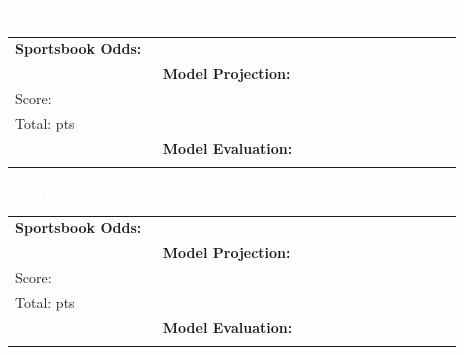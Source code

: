 \documentclass[10pt,a4paper]{article}
\begin{document}
\vspace{8pt}

\noindent\colorbox{matchupbar}{\parbox{\dimexpr\linewidth-2\fboxsep}{%
  \vspace{3pt}\hspace{4pt}{\bfseries\large\textcolor{white}{Philadelphia 76ers @ Los Angeles Clippers}}
  \hfill{\small\textcolor{white}{Pace:  poss/team}}\vspace{3pt}
}}
\vspace{4pt}

\begin{tabular}{@{}p{0.32\linewidth}p{0.32\linewidth}p{0.33\linewidth}@{}}
\small
\textbf{Sportsbook Odds:} \\
&
\textbf{Model Projection:} \\
Score: \textbf{}\\
Total: \textbf{} pts\\
&
\textbf{Model Evaluation:} \\
\\
\end{tabular}

\vspace{8pt}

\noindent\colorbox{matchupbar}{\parbox{\dimexpr\linewidth-2\fboxsep}{%
  \vspace{3pt}\hspace{4pt}{\bfseries\large\textcolor{white}{New Orleans Pelicans @ Charlotte Hornets}}
  \hfill{\small\textcolor{white}{Pace:  poss/team}}\vspace{3pt}
}}
\vspace{4pt}

\begin{tabular}{@{}p{0.32\linewidth}p{0.32\linewidth}p{0.33\linewidth}@{}}
\small
\textbf{Sportsbook Odds:} \\
&
\textbf{Model Projection:} \\
Score: \textbf{}\\
Total: \textbf{} pts\\
&
\textbf{Model Evaluation:} \\
\\
\end{tabular}

\vspace{8pt}
\end{document}
